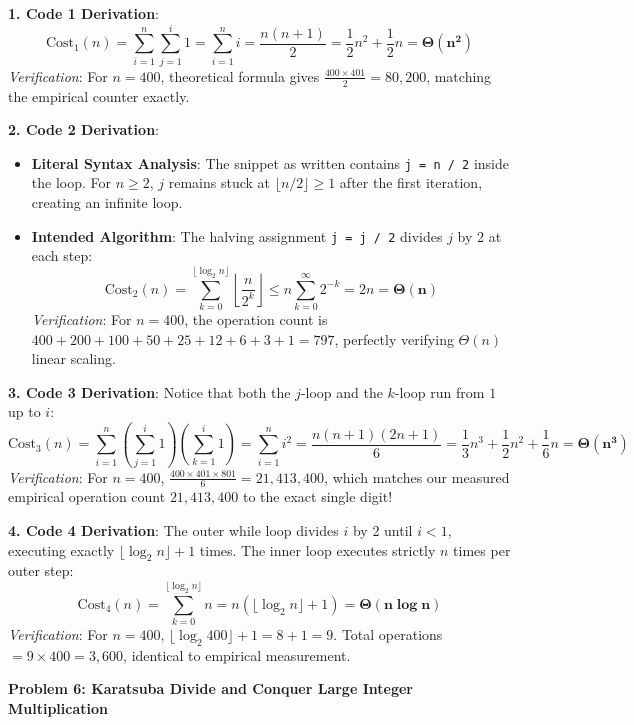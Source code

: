 \documentclass[12pt]{article}
\begin{document}
\textbf{1. Code 1 Derivation}:
\[
\text{Cost}_1(n) = \sum_{i=1}^n \sum_{j=1}^i 1 = \sum_{i=1}^n i = \frac{n(n + 1)}{2} = \frac{1}{2}n^2 + \frac{1}{2}n = \mathbf{\Theta(n^2)}
\]
\textit{Verification}: For $n = 400$, theoretical formula gives $\frac{400 \times 401}{2} = 80,200$, matching the empirical counter exactly.

\textbf{2. Code 2 Derivation}:
\begin{itemize}
    \item \textbf{Literal Syntax Analysis}: The snippet as written contains \texttt{j = n / 2} inside the loop. For $n \ge 2$, $j$ remains stuck at $\lfloor n/2 \rfloor \ge 1$ after the first iteration, creating an infinite loop.
    \item \textbf{Intended Algorithm}: The halving assignment \texttt{j = j / 2} divides $j$ by 2 at each step:
    \[
    \text{Cost}_2(n) = \sum_{k=0}^{\lfloor \log_2 n \rfloor} \left\lfloor \frac{n}{2^k} \right\rfloor \le n \sum_{k=0}^\infty 2^{-k} = 2n = \mathbf{\Theta(n)}
    \]
    \textit{Verification}: For $n = 400$, the operation count is $400 + 200 + 100 + 50 + 25 + 12 + 6 + 3 + 1 = 797$, perfectly verifying $\Theta(n)$ linear scaling.
\end{itemize}

\textbf{3. Code 3 Derivation}:
Notice that both the $j$-loop and the $k$-loop run from $1$ up to $i$:
\[
\text{Cost}_3(n) = \sum_{i=1}^n \left( \sum_{j=1}^i 1 \right) \left( \sum_{k=1}^i 1 \right) = \sum_{i=1}^n i^2 = \frac{n(n + 1)(2n + 1)}{6} = \frac{1}{3}n^3 + \frac{1}{2}n^2 + \frac{1}{6}n = \mathbf{\Theta(n^3)}
\]
\textit{Verification}: For $n = 400$, $\frac{400 \times 401 \times 801}{6} = 21,413,400$, which matches our measured empirical operation count $21,413,400$ to the exact single digit!

\textbf{4. Code 4 Derivation}:
The outer while loop divides $i$ by 2 until $i < 1$, executing exactly $\lfloor \log_2 n \rfloor + 1$ times. The inner loop executes strictly $n$ times per outer step:
\[
\text{Cost}_4(n) = \sum_{k=0}^{\lfloor \log_2 n \rfloor} n = n (\lfloor \log_2 n \rfloor + 1) = \mathbf{\Theta(n \log n)}
\]
\textit{Verification}: For $n = 400$, $\lfloor \log_2 400 \rfloor + 1 = 8 + 1 = 9$. Total operations $= 9 \times 400 = 3,600$, identical to empirical measurement.

\newpage

\begin{center}
\textbf{Problem 6: Karatsuba Divide and Conquer Large Integer Multiplication}
\end{center}
\end{document}
